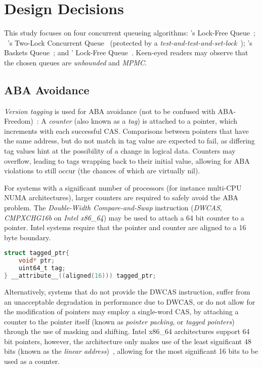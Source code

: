 \section{Design Decisions}
This study focuses on four concurrent queueing algorithms:
\citeauthor{michael1996simple}'s Lock-Free Queue~\citep{michael1996simple};
~\citeauthor{michael1996simple}'s Two-Lock Concurrent
Queue~\citep{michael1996simple} (protected by a \emph{test-and-test-and-set-lock}~\citep{mellor1991algorithms}); \citeauthor{hoffman2007baskets}'s Baskets
Queue~\citep{hoffman2007baskets}; and \citeauthor{valois1994queues}' Lock-Free
Queue~\citep{valois1994queues}. Keen-eyed readers may observe that the chosen
queues are \emph{unbounded} and \emph{MPMC}.

\subsection{ABA Avoidance}

\emph{Version tagging} is used for ABA avoidance (not to be confused with
ABA-Freedom)~\citep{dechev2010understanding}:
A \emph{counter} (also known as a \emph{tag}) is attached to a pointer, which increments with
each successful CAS. Comparisons between pointers that have the same address,
but do not match in tag value are expected to fail, as differing tag values hint
at the possibility of a change in logical data. Counters may overflow, leading to tags wrapping back
to their initial value, allowing for ABA violations to still occur (the chances
of which are virtually nil).

For systems with a significant number of processors (for instance multi-CPU
NUMA architectures), larger counters are required  to safely avoid the ABA
problem. The \emph{Double-Width Compare-and-Swap} instruction (\emph{DWCAS},
\emph{CMPXCHG16b} on \emph{Intel x86\_64}) may be used to attach a 64 bit
counter to a pointer. 
Intel systems require that the pointer and counter are aligned to a 16 byte
boundary.

\begin{lstlisting}[language=C,caption={Struct aligned to 16 bytes, as required by the DWCAS instruction.}]
struct tagged_ptr{
    void* ptr;
    uint64_t tag;
} __attribute__((aligned(16))) tagged_ptr;
\end{lstlisting}

Alternatively, systems that do not provide the DWCAS instruction, suffer from
an unacceptable degradation in performance due to DWCAS, or do not allow for
the modification of pointers may employ a single-word CAS, by attaching a
counter to the pointer itself (known as \emph{pointer packing}, or \emph{tagged
pointers}) through the use of masking and shifting. Intel x86\_64 architectures support 64 bit pointers, however, the
architecture only makes use of the least significant 48 bits (known as the
\emph{linear address})~\citep[Section~3.3.7.1]{intel2021system}, allowing for
the most significant 16 bits to be used as a counter.

